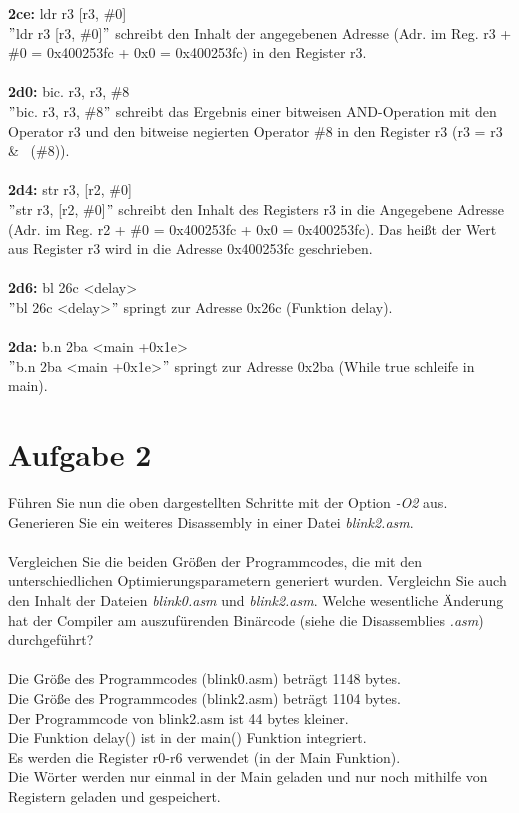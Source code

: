 \textbf{2ce:} ldr r3 [r3, \#0]\\
$"$ldr r3 [r3, \#0]$"$ schreibt den Inhalt der angegebenen Adresse (Adr. im Reg. r3 + \#0 = 0x400253fc + 0x0 = 0x400253fc) in den Register r3.\\ \\
\textbf{2d0:} bic. r3, r3, \#8\\
$"$bic. r3, r3, \#8$"$ schreibt das Ergebnis einer bitweisen AND-Operation mit den Operator r3 und den bitweise negierten Operator \#8 in den Register r3 (r3 = r3 \& ~(\#8)).\\ \\
\textbf{2d4:} str r3, [r2, \#0]\\
$"$str r3, [r2, \#0]$"$ schreibt den Inhalt des Registers r3 in die Angegebene Adresse (Adr. im Reg. r2 + \#0 = 0x400253fc + 0x0 = 0x400253fc). Das hei\ss{}t der Wert aus Register r3 wird in die Adresse 0x400253fc geschrieben.\\ \\
\textbf{2d6:} bl 26c <delay>\\
$"$bl 26c <delay>$"$ springt zur Adresse 0x26c (Funktion delay).\\ \\
\textbf{2da:} b.n 2ba <main +0x1e>\\
$"$b.n 2ba <main +0x1e>$"$ springt zur Adresse 0x2ba (While true schleife in main).\\
\section{Aufgabe 2}
Führen Sie nun die oben dargestellten Schritte mit der Option \textit{-O2} aus. Generieren Sie ein weiteres Disassembly in einer Datei \textit{blink2.asm}.\\ \\
Vergleichen Sie die beiden Grö\ss{}en der Programmcodes, die mit den unterschiedlichen Optimierungsparametern generiert wurden. Vergleichn Sie auch den Inhalt der Dateien \textit{blink0.asm} und \textit{blink2.asm}. Welche wesentliche Änderung hat der Compiler am auszufürenden Binärcode (siehe die Disassemblies \textit{.asm}) durchgeführt?\\ \\
Die Grö\ss{}e des Programmcodes (blink0.asm) beträgt 1148 bytes.\\
Die Grö\ss{}e des Programmcodes (blink2.asm) beträgt 1104 bytes.\\
Der Programmcode von blink2.asm ist 44 bytes kleiner.\\
Die Funktion delay() ist in der main() Funktion integriert.\\
Es werden die Register r0-r6 verwendet (in der Main Funktion).\\
Die Wörter werden nur einmal in der Main geladen und nur noch mithilfe von Registern geladen und gespeichert.\\
\newpage

